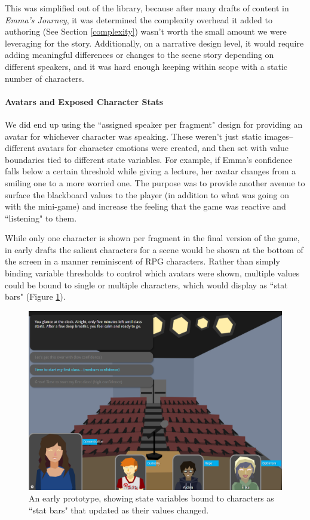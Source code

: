 
This was simplified out of the library, because after many drafts of content in \textit{Emma's Journey}, it was determined the complexity overhead it added to authoring (See Section \ref{complexity}) wasn't worth the small amount we were leveraging for the story. Additionally, on a narrative design level, it would require adding meaningful differences or changes to the scene story depending on different speakers, and it was hard enough keeping within scope with a static number of characters.

\paragraph{Avatars and Exposed Character Stats}

We did end up using the ``assigned speaker per fragment" design for providing an avatar for whichever character was speaking. These weren't just static images--different avatars for character emotions were created, and then set with value boundaries tied to different state variables. For example, if Emma's confidence falls below a certain threshold while giving a lecture, her avatar changes from a smiling one to a more worried one. The purpose was to provide another avenue to surface the blackboard values to the player (in addition to what was going on with the mini-game) and increase the feeling that the game was reactive and ``listening" to them.

While only one character is shown per fragment in the final version of the game, in early drafts the salient characters for a scene would be shown at the bottom of the screen in a manner reminiscent of RPG characters. Rather than simply binding variable thresholds to control which avatars were shown, multiple values could be bound to single or multiple characters, which would display as ``stat bars" (Figure \ref{fig:lecture}).


\begin{figure}
    \centering
    \includegraphics[width=12cm]{figures/3-StoryAssembler/lecture.png}
    \caption{An early prototype, showing state variables bound to characters as ``stat bars" that updated as their values changed.}
    \label{fig:lecture}
\end{figure}

